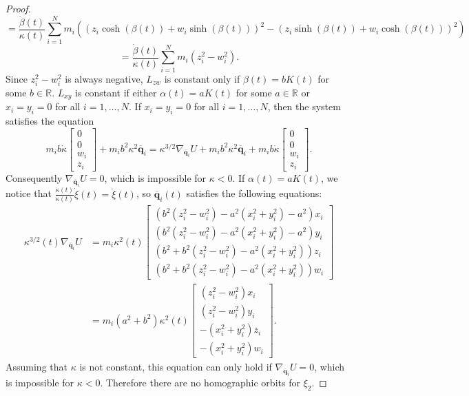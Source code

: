 \documentclass[12pt]{amsart}
\theoremstyle{definition}
\def \mb{\mathbb}
\def \R{\mb R}                 %
\newcommand {\q} {\mathbf{q}}
\begin{document}
{\begin{proof}
$$$$
$$
= \frac{\dot{\beta}(t)}{\kappa(t)}\sum\limits_{i=1}^N m_i((z_i\cosh(\beta(t))+w_i\sinh(\beta(t)))^2-(z_i\sinh(\beta(t))+w_i\cosh(\beta(t)))^2)
$$
$$
= \frac{\dot{\beta}(t)}{\kappa(t)}\sum\limits_{i=1}^N m_i(z_i^2-w_i^2).
$$
Since $z_i^2-w_i^2$ is always negative, $L_{zw}$ is constant only if $\beta(t)=bK(t)$ for some $b \in \R$. $L_{xy}$ is constant if either $\alpha(t)=aK(t)$ for some $a \in \R$ or $x_i=y_i=0$ for all $i=1,\ldots, N$. If $x_i=y_i=0$ for all $i=1,\ldots, N$, then the system satisfies the equation \begin{equation*}
m_ib\dot{\kappa}\begin{bmatrix}0\\0\\w_i\\z_i\end{bmatrix}+m_ib^2\kappa^2\overline{\q}_i = \kappa^{3/2}\nabla_{\overline{\q}_i} U + m_ib^2\kappa^2\overline{\q}_i + m_ib\dot{\kappa}\begin{bmatrix}0\\0\\w_i\\z_i\end{bmatrix}.
\end{equation*}
Consequently $\nabla_{\overline{\q}_i} U=0$, which is impossible for $\kappa <0$\cite{Diacu3, DiacuZhu}. If $\alpha(t)=aK(t)$, we notice that $\frac{\dot{\kappa}(t)}{\kappa(t)}\dot{\xi}(t)=\ddot{\xi}(t)$, so $\overline{\q}_i(t)$ satisfies the following equations:
\begin{align*}
\kappa^{3/2}(t) \nabla_{\overline{\q}_i} U&= m_i\kappa^2(t) \begin{bmatrix} (b^2(z_i^2-w_i^2)-a^2(x_i^2+y_i^2)-a^2)x_i\\ (b^2(z_i^2-w_i^2)-a^2(x_i^2+y_i^2)-a^2)y_i\\ (b^2+b^2(z_i^2-w_i^2)-a^2(x_i^2+y_i^2))z_i\\ (b^2+b^2(z_i^2-w_i^2)-a^2(x_i^2+y_i^2))w_i\end{bmatrix}\\
&= m_i(a^2+b^2)\kappa^2(t)\begin{bmatrix}(z_i^2-w_i^2)x_i\\ (z_i^2-w_i^2)y_i\\ -(x_i^2+y_i^2)z_i\\ -(x_i^2+y_i^2)w_i\end{bmatrix}.\end{align*}
Assuming that $\kappa$ is not constant, this equation can only hold if $\nabla_{\overline{\q}_i} U=0$, which is impossible for $\kappa<0$. Therefore there are no homographic orbits for $\xi_2$.
\end{proof}


}
\end{document}
